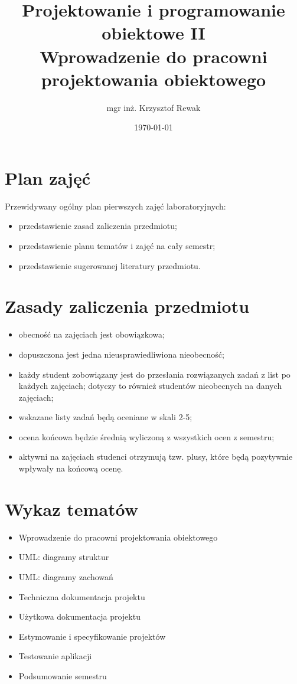 \documentclass{article}
\title{
	Projektowanie i programowanie obiektowe II\\
	\Huge{Wprowadzenie do pracowni projektowania obiektowego}
}
\author{mgr inż. Krzysztof Rewak}
\date{\today}
\begin{document}
	\maketitle

	\section*{Plan zajęć}
	Przewidywany ogólny plan pierwszych zajęć laboratoryjnych: 
	\begin{itemize}
	\item przedstawienie zasad zaliczenia przedmiotu; 
	\item przedstawienie planu tematów i zajęć na cały semestr; 
	\item przedstawienie sugerowanej literatury przedmiotu.
	\end{itemize}
	
	\section*{Zasady zaliczenia przedmiotu}
	\begin{itemize}
	\item obecność na zajęciach jest obowiązkowa;
	\item dopuszczona jest jedna nieusprawiedliwiona nieobecność;
	\item każdy student zobowiązany jest do przesłania rozwiązanych zadań z list po każdych zajęciach; dotyczy to również studentów nieobecnych na danych zajęciach;
	\item wskazane listy zadań będą oceniane w skali 2-5;
	\item ocena końcowa będzie średnią wyliczoną z wszystkich ocen z semestru;
	\item aktywni na zajęciach studenci otrzymują tzw. plusy, które będą pozytywnie wpływały na końcową ocenę.
	\end{itemize}
	
	\section*{Wykaz tematów}
	\begin{itemize}
	\item Wprowadzenie do pracowni projektowania obiektowego
	\item UML: diagramy struktur
	\item UML: diagramy zachowań
	\item Techniczna dokumentacja projektu
	\item Użytkowa dokumentacja projektu
	\item Estymowanie i specyfikowanie projektów
	\item Testowanie aplikacji
	\item Podsumowanie semestru
	\end{itemize}
	
\end{document}
